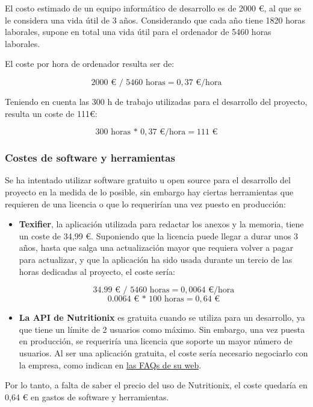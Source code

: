 El costo estimado de un equipo informático de desarrollo es de \num{2000} €, al que se le considera una vida útil de 3 años. Considerando que cada año tiene \num{1820} horas laborales, supone en total una vida útil para el ordenador de \num{5460} horas laborales.

El coste por hora de ordenador resulta ser de: 

\[ \num{2000} \text{ € / } \num{5460} \text{ horas} = 0,37 \text{ €/hora}\]

Teniendo en cuenta las 300 h de trabajo utilizadas para el desarrollo del proyecto, resulta un coste de 111€:

\[\num{300} \text{ horas * } 0,37 \text{ €/hora} = 111 \text{ €}\]

\subsubsection{Costes de software y herramientas}

Se ha intentado utilizar software gratuito u open source para el desarrollo del proyecto en la medida de lo posible, sin embargo hay ciertas herramientas que requieren de una licencia o que lo requerirían una vez puesto en producción:

\begin{itemize}
	\item \textbf{Texifier}, la aplicación utilizada para redactar los anexos y la memoria, tiene un coste de 34,99 €. Suponiendo que la licencia puede llegar a durar unos 3 años, hasta que salga una actualización mayor que requiera volver a pagar para actualizar, y que la aplicación ha sido usada durante un tercio de las horas dedicadas al proyecto, el coste sería:

\[\num{34,99} \text{ € / } 5460 \text{ horas} = 0,0064 \text{ €/hora}\]
\[\num{0,0064} \text{ € * } 100 \text{ horas} = 0,64 \text{ €}\]

	\item \textbf{La API de Nutritionix} es gratuita cuando se utiliza para un desarrollo, ya que tiene un límite de 2 usuarios como máximo. Sin embargo, una vez puesta en producción, se requeriría una licencia que soporte un mayor número de usuarios. Al ser una aplicación gratuita, el coste sería necesario negociarlo con la empresa, como indican en \href{https://www.nutritionix.com/business/api}{las FAQs de su web}.

\end{itemize}

Por lo tanto, a falta de saber el precio del uso de Nutritionix, el coste quedaría en 0,64 € en gastos de software y herramientas.


